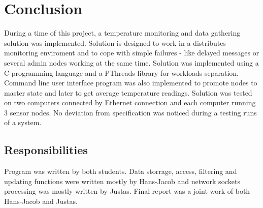 \section{Conclusion}
\label{sec:conclusion}

During a time of this project, a temperature monitoring and data gathering solution was implemented. Solution is designed to work in a distributes monitoring enviroment and to cope with simple failures - like delayed messages or several admin nodes working at the same time. Solution was implemented using a C programming language and a PThreads library for workloads separation. Command line user interface program was also implemented to promote nodes to master state and later to get average temperature readings. Solution was tested on two computers connected by Ethernet connection and each computer running 3 sensor nodes. No deviation from specification was noticed during a testing runs of a system.

\subsection{Responsibilities}
\label{subsec:responsebilities}

Program was written by both students. Data storrage, access, filtering and updating functions were written mostly by Hans-Jacob and network sockets processing was mostly written by Justas. Final report was a joint work of both Hans-Jacob and Justas.
